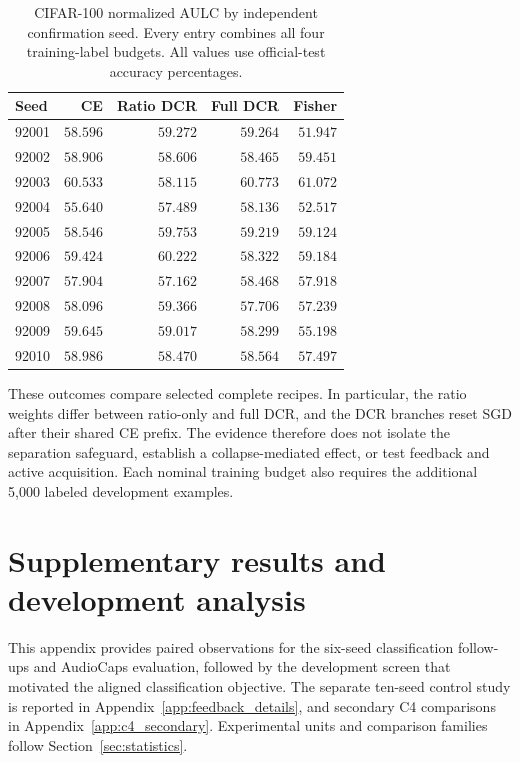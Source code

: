 \documentclass[10pt,a4paper,twocolumn]{article}
\begin{document}
\begin{table}[tbp]
\centering\footnotesize
\setlength{\tabcolsep}{2pt}
\caption{CIFAR-100 normalized AULC by independent confirmation seed. Every entry combines all four training-label budgets. All values use official-test accuracy percentages.}
\label{tab:cifar100_seed_aulc}
\begin{tabular*}{\linewidth}{@{\extracolsep{\fill}}lrrrr@{}}
\toprule
Seed & CE & Ratio DCR & Full DCR & Fisher \\
\midrule
92001 & $58.596$ & $59.272$ & $59.264$ & $51.947$ \\
92002 & $58.906$ & $58.606$ & $58.465$ & $59.451$ \\
92003 & $60.533$ & $58.115$ & $60.773$ & $61.072$ \\
92004 & $55.640$ & $57.489$ & $58.136$ & $52.517$ \\
92005 & $58.546$ & $59.753$ & $59.219$ & $59.124$ \\
92006 & $59.424$ & $60.222$ & $58.322$ & $59.184$ \\
92007 & $57.904$ & $57.162$ & $58.468$ & $57.918$ \\
92008 & $58.096$ & $59.366$ & $57.706$ & $57.239$ \\
92009 & $59.645$ & $59.017$ & $58.299$ & $55.198$ \\
92010 & $58.986$ & $58.470$ & $58.564$ & $57.497$ \\
\bottomrule
\end{tabular*}
\end{table}

These outcomes compare selected complete recipes. In particular, the
ratio weights differ between ratio-only and full DCR, and the DCR
branches reset SGD after their shared CE prefix. The evidence therefore
does not isolate the separation safeguard, establish a collapse-mediated
effect, or test feedback and active acquisition. Each nominal training
budget also requires the additional 5,000 labeled development examples.
\FloatBarrier

\section{Supplementary results and development analysis}
\label{app:classification_details}

This appendix provides paired observations for the six-seed
classification follow-ups and AudioCaps evaluation, followed by the
development screen that motivated the aligned classification objective.
The separate ten-seed control study is reported in
Appendix~\ref{app:feedback_details}, and secondary C4 comparisons in
Appendix~\ref{app:c4_secondary}. Experimental units and comparison
families follow Section~\ref{sec:statistics}.
\end{document}
